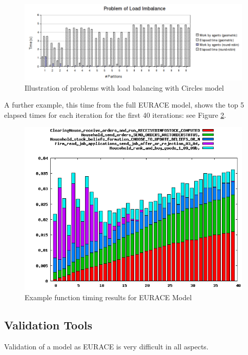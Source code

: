 \begin{figure}[h]
  \hspace{-10mm}
  \includegraphics[scale=0.6]{timings-problems.png}
 \caption{Illustration of problems with load balancing with Circles model}
 \label{fig:timings_problems}
\end{figure}

A further example, this time from the full EURACE model, shows the top 5 elapsed times for each iteration for the first 40 iterations: see Figure \ref{fig:timing_example}.

\begin{figure}[h]
  \hspace{-10mm}
  \includegraphics[scale=0.5]{timing_example.png}
 \caption{Example function timing results for EURACE Model}
 \label{fig:timing_example}
\end{figure}
\subsection{Validation Tools}
Validation of a model as EURACE is very difficult in all aspects.